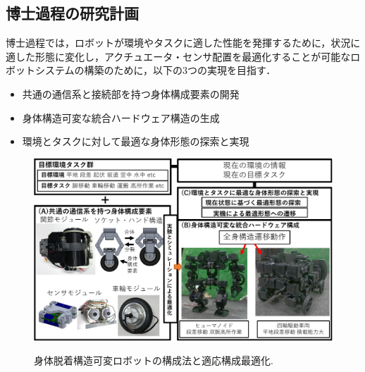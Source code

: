 \documentclass[twocolumn]{d-abst}
\begin{document}
\subsection{博士過程の研究計画}
博士過程では，ロボットが環境やタスクに適した性能を発揮するために，状況に適した形態に変化し，アクチュエータ・センサ配置を最適化することが可能なロボットシステムの構築のために，以下の3つの実現を目指す．
\begin{itemize}
\item 共通の通信系と接続部を持つ身体構成要素の開発
\item 身体構造可変な統合ハードウェア構造の生成
\item 環境とタスクに対して最適な身体形態の探索と実現
\end{itemize}

\begin{figure}[tbh]
 \begin{center}
  \begin{minipage}{1.0\columnwidth}
    \includegraphics[width=\columnwidth]{4_matome.pdf}
   \caption{身体脱着構造可変ロボットの構成法と適応構成最適化.}
  \end{minipage}
  \label{figure:nowprinting}
 \end{center}
\end{figure}
\end{document}
